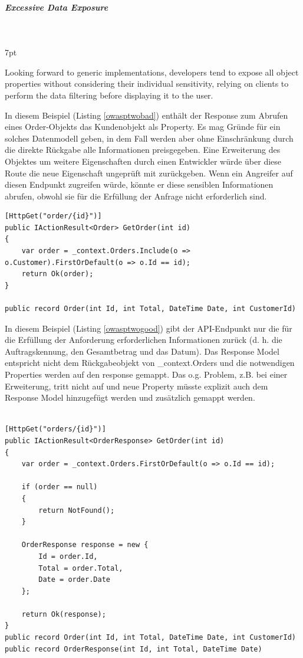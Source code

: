 \documentclass[notitlepage, hidelinks]{article}
\newenvironment{formal}{%
  \def\FrameCommand{%
    \hspace{1pt}%
    {\color{black}\vrule width 2pt}%
    {\color{formalshade}\vrule width 4pt}%
    \colorbox{formalshade}%
  }%
  \MakeFramed{\advance\hsize-\width\FrameRestore}%
  \noindent\hspace{-4.55pt}%
  \begin{adjustwidth}{}{7pt}%
  \vspace{2pt}\vspace{2pt}%
}
{%
  \vspace{2pt}\end{adjustwidth}\endMakeFramed%
}
\begin{document}
\subparagraph{Excessive Data Exposure} \mbox{} \\
\begin{formal}
Looking forward to generic implementations, developers tend to expose all object properties without considering their individual sensitivity, relying on clients to perform the data filtering before displaying it to the user.
\end{formal}
In diesem Beispiel (Listing \ref{owasptwobad}) enthält der Response zum Abrufen eines Order-Objekts das Kundenobjekt als Property. Es mag Gründe für ein solches Datenmodell geben, in dem Fall werden aber ohne Einschränkung durch die direkte Rückgabe alle Informationen preisgegeben. Eine Erweiterung des Objektes  um weitere Eigenschaften durch einen Entwickler würde über diese Route die neue Eigenschaft ungeprüft mit zurückgeben. Wenn ein Angreifer auf diesen Endpunkt zugreifen würde, könnte er diese sensiblen Informationen abrufen, obwohl sie für die Erfüllung der Anfrage nicht erforderlich sind.

\begin{lstlisting}[language={[Sharp]C},frame=single,caption=Negativbeispiel Excessive Data Exposure,label=owasptwobad]
[HttpGet("order/{id}")]
public IActionResult<Order> GetOrder(int id)
{
    var order = _context.Orders.Include(o => o.Customer).FirstOrDefault(o => o.Id == id);
    return Ok(order);
}

public record Order(int Id, int Total, DateTime Date, int CustomerId)
\end{lstlisting}

In diesem Beispiel (Listing \ref{owasptwogood}) gibt der API-Endpunkt nur die für die Erfüllung der Anforderung erforderlichen Informationen zurück (d. h. die Auftragskennung, den Gesamtbetrag und das Datum). Das Response Model entspricht nicht dem Rückgabeobjekt von \_context.Orders und die notwendigen Properties werden auf den response gemappt. Das o.g. Problem, z.B. bei einer Erweiterung, tritt nicht auf und neue Property müsste explizit auch dem Response Model hinzugefügt werden und zusätzlich gemappt werden.

\begin{lstlisting}[language={[Sharp]C},frame=single,caption=Positivbeispiel Excessive Data Exposure,label=owasptwogood]

[HttpGet("orders/{id}")]
public IActionResult<OrderResponse> GetOrder(int id)
{
    var order = _context.Orders.FirstOrDefault(o => o.Id == id);

    if (order == null)
    {
        return NotFound();
    }

    OrderResponse response = new {
        Id = order.Id,
        Total = order.Total,
        Date = order.Date
    };

    return Ok(response);
}
public record Order(int Id, int Total, DateTime Date, int CustomerId)
public record OrderResponse(int Id, int Total, DateTime Date)
\end{lstlisting}
\end{document}
